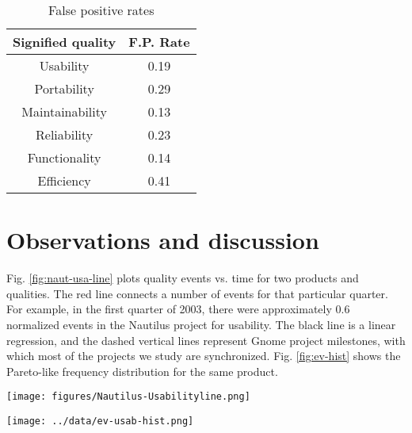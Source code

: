 \documentclass[conference, compsoc]{IEEEtran}
\begin{document}
\begin{table}
	\caption{False positive rates}
	\centering
	\label{tbl:error}
\begin{tabular}{|c|c|}
\hline
\rowcolor[gray]{.9} 
Signified quality & F.P. Rate  \\ \hline
Usability & 0.19\\ \hline
Portability & 0.29\\ \hline
Maintainability & 0.13\\ \hline
Reliability & 0.23\\ \hline
Functionality & 0.14 \\ \hline
Efficiency & 0.41\\ \hline
\hline
\end{tabular}
\end{table}

\section{Observations and discussion}
\label{sec:observations}
Fig. \ref{fig:naut-usa-line} plots quality events vs. time for two products and qualities. The red line connects a number of events for that particular quarter. For example, in the first quarter of 2003, there were approximately 0.6 normalized events in the Nautilus project for usability. The black line is a linear regression, and the dashed vertical lines represent Gnome project milestones, with which most of the projects we study are synchronized. Fig. \ref{fig:ev-hist} shows the Pareto-like frequency distribution for the same product.
\begin{figure*}[]
\begin{minipage}[]{0.5\textwidth}
\centering
\texttt{[image: figures/Nautilus-Usabilityline.png]}%
\label{fig:naut-usa-line}
\caption{Product: Nautilus, Quality: Usability}
\end{minipage}%
\hspace{0.2cm}
\begin{minipage}[]{0.5\textwidth}
\centering
\texttt{[image: ../data/ev-usab-hist.png]}%
\label{fig:ev-hist}
\caption{Distribution plot for product: Evolution, quality: usability}
\end{minipage}
\end{figure*}
\end{document}
